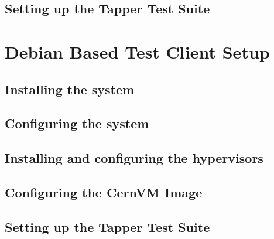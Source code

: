 \subsection{Setting up the Tapper Test Suite}

\section{Debian Based Test Client Setup}
\subsection{Installing the system}
\subsection{Configuring the system}
\subsection{Installing and configuring the hypervisors}
\subsection{Configuring the CernVM Image}
\subsection{Setting up the Tapper Test Suite}
